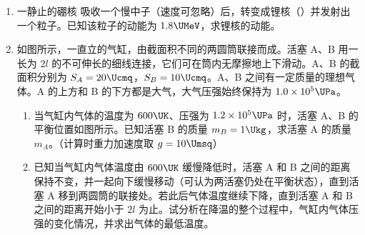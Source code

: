 \documentclass[\gkver]{gaokaozhenti}
\begin{document}
\begin{enumerate}
{则 $\Delta U = U_{2} - U_{3} = 230 - 220 = 10\UV$，

故 $P=\frac{\Delta U^{2}}{R}=\frac{10^{2}}{2}=50\UW$。
}

\item
一静止的硼核  吸收一个慢中子（速度可忽略）后，转变成锂核（）并发射出一个粒子。已知该粒子的动能为 $1.8\UMeV$，求锂核的动能。
\jdanswer{
$1.03\UMeV$
}


\item
如图所示，一直立的气缸，由截面积不同的两圆筒联接而成。活塞 A、B 用一长为 $2l$ 的不可伸长的细线连接，它们可在筒内无摩擦地上下滑动。A、B 的截面积分别为 $S_{A} = 20\Ucmq$，$S_{B} = 10\Ucmq$。A、B 之间有一定质量的理想气体。A 的上方和 B 的下方都是大气，大气压强始终保持为 $1.0\times10^{5}\UPa$。
\begin{enumerate}
	\item
	当气缸内气体的温度为 $600\UK$、压强为 $1.2\times10^{5}\UPa$ 时，活塞 A、B 的平衡位置如图所示。已知活塞 B 的质量 $m_{B} = 1\Ukg$，求活塞 A 的质量 $m_{A}$。（计算时重力加速度取 $g = 10\Umsq$）
	\item
	已知当气缸内气体温度由 $600\UK$ 缓慢降低时，活塞 A 和 B 之间的距离保持不变，并一起向下缓慢移动（可认为两活塞仍处在平衡状态），直到活塞 A 移到两圆筒的联接处。若此后气体温度继续下降，直到活塞 A 和 B 之间的距离开始小于 $2l$ 为止。试分析在降温的整个过程中，气缸内气体压强的变化情况，并求出气体的最低温度。
\end{enumerate}
\jdanswer{
\begin{enumerate}
	\item
	$1\Ukg$


\end{enumerate}}
\end{enumerate}
\end{document}
